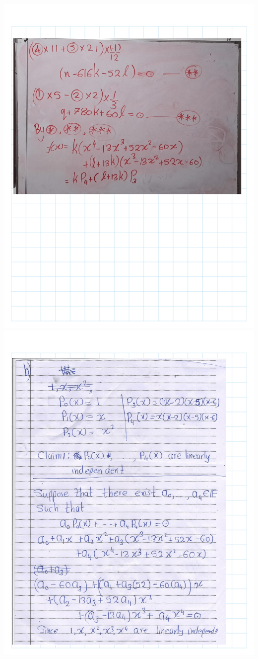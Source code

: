 \documentclass[
]{book}
\theoremstyle{definition}
\theoremstyle{definition}
\theoremstyle{definition}
\theoremstyle{definition}
\theoremstyle{remark}
\begin{document}
\includegraphics{fig/Ex 2B and 2C/Ex 2c (26).png}
\includegraphics{fig/Ex 2B and 2C/Ex 2c (27).png}
\end{document}
